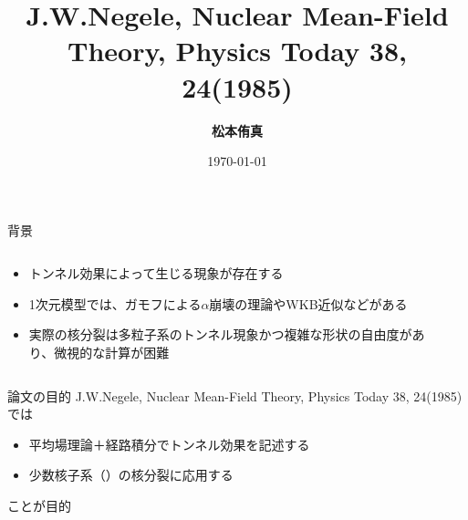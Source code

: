 \documentclass[14pt,aspectratio=169,xcolor=dvipsnames,table,dvipdfmx]{beamer}
\title{J.W.Negele, Nuclear Mean-Field Theory, Physics Today 38, 24(1985)}
\author{\textbf{松本侑真}}
\date{\today}
\institute{原子核理論 関澤研究室}
\theoremstyle{definition}
\begin{document}
\maketitle




\begin{frame}{背景}
  \begin{columns}[t]
    \begin{column}{.5\textwidth}
      \begin{itemize}
        \item {\color{AlertOrange}トンネル効果}によって生じる現象が存在する
        \item 1次元模型では、ガモフによる$\alpha$崩壊の理論やWKB近似などがある
        \item 実際の核分裂は多粒子系のトンネル現象かつ複雑な形状の自由度があり、微視的な計算が困難
      \end{itemize}
    \end{column}
    \begin{column}{.5\textwidth}
    \end{column}
  \end{columns}
\end{frame}

\begin{frame}{論文の目的}
  J.W.Negele, Nuclear Mean-Field Theory, Physics Today 38, 24(1985)では
  \begin{itemize}
    \item 平均場理論＋経路積分でトンネル効果を記述する
    \item 少数核子系（）の核分裂に応用する
  \end{itemize}
  ことが目的
\end{frame}
\end{document}
